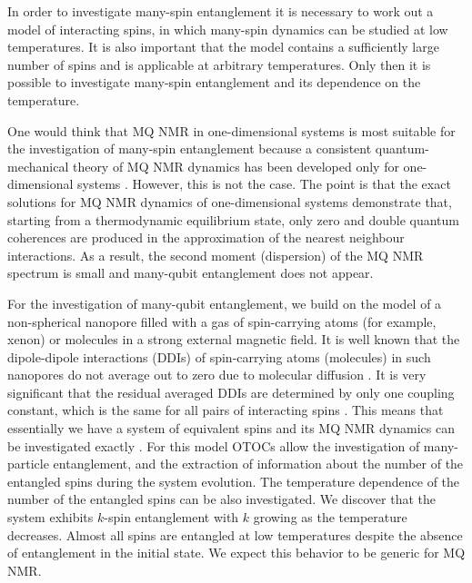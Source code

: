 \documentclass[%
 reprint,
superscriptaddress,
 amsmath,amssymb,
]{revtex4-2}
\begin{document}
\par
In order to investigate many-spin entanglement it is necessary to work out a model of interacting spins, in which many-spin dynamics can be studied at low temperatures. 
It is also important that the model contains a sufficiently large number of spins and is applicable at arbitrary temperatures.
Only then it is possible to investigate many-spin entanglement and its dependence on the temperature.
\par
One would think that MQ NMR in one-dimensional systems is most suitable for the investigation of many-spin entanglement because a consistent quantum-mechanical theory of MQ NMR dynamics has been developed only for one-dimensional systems \cite{lab:nmr_dyn_1996,lab:mq_nmr_in_chain_1997,lab:mq_dyn_of_chain_in_solid_2000}. However, this is not the case. The point is that the exact solutions for MQ NMR dynamics of one-dimensional systems demonstrate \cite{lab:nmr_dyn_1996,lab:mq_nmr_in_chain_1997,lab:mq_dyn_of_chain_in_solid_2000} that, starting from a thermodynamic equilibrium state, only zero and double quantum coherences are produced in the approximation of the nearest neighbour interactions. As a result, the second moment (dispersion) of the MQ NMR spectrum is small and many-qubit entanglement does not appear.
\par
For the investigation of many-qubit entanglement, we build on the model \cite{nanopore_model} of a non-spherical nanopore filled with a gas of spin-carrying atoms (for example, xenon) or molecules in a strong external magnetic field. 
It is well known that the dipole-dipole interactions (DDIs) of spin-carrying atoms (molecules) in such nanopores do not average out to zero due to molecular diffusion \cite{nanopore_model,lab:depolar_in_nanocavities_2004}. 
It is very significant that the residual averaged DDIs are determined by only one coupling constant, which is the same for all pairs of interacting spins \cite{nanopore_model,lab:depolar_in_nanocavities_2004}. 
This means that essentially we have a system of equivalent spins and its MQ NMR dynamics can be investigated exactly \cite{lab:mq_nmr_dyn_in_nanopores_2009}.
For this model OTOCs allow the investigation of many-particle entanglement, and the extraction of information about the number of the entangled spins during the system evolution. 
The temperature dependence of the number of the entangled spins can be also investigated.
We discover that the system exhibits $k$-spin entanglement with $k$ growing as the temperature decreases. 
Almost all spins are entangled at low temperatures despite the absence of  entanglement in the initial state. We expect this behavior to be generic for MQ NMR.
\end{document}
